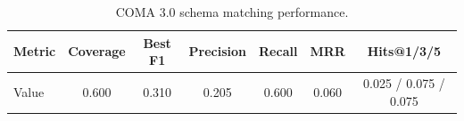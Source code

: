 \begin{table}[h]
\centering
\caption{COMA 3.0 schema matching performance.}
\label{tab:coma_results}
\begin{tabular}{lcccccc}
\hline
Metric & Coverage & Best F1 & Precision & Recall & MRR & Hits@1/3/5 \\
\hline
Value & 0.600 & 0.310 & 0.205 & 0.600 & 0.060 & 0.025 / 0.075 / 0.075 \\
\hline
\end{tabular}
\end{table}
